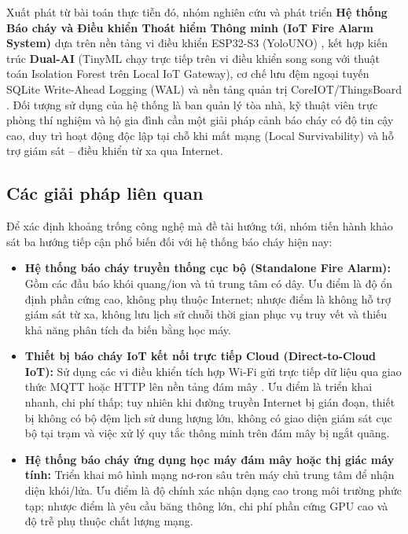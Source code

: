 Xuất phát từ bài toán thực tiễn đó, nhóm nghiên cứu và phát triển \textbf{Hệ thống Báo cháy và Điều khiển Thoát hiểm Thông minh (IoT Fire Alarm System)} dựa trên nền tảng vi điều khiển ESP32-S3 (YoloUNO) \cite{ref_esp32s3}, kết hợp kiến trúc \textbf{Dual-AI} (TinyML chạy trực tiếp trên vi điều khiển song song với thuật toán Isolation Forest \cite{ref_iforest} trên Local IoT Gateway), cơ chế lưu đệm ngoại tuyến SQLite Write-Ahead Logging (WAL) \cite{ref_sqlite_wal} và nền tảng quản trị CoreIOT/ThingsBoard \cite{ref_thingsboard}. Đối tượng sử dụng của hệ thống là ban quản lý tòa nhà, kỹ thuật viên trực phòng thí nghiệm và hộ gia đình cần một giải pháp cảnh báo cháy có độ tin cậy cao, duy trì hoạt động độc lập tại chỗ khi mất mạng (Local Survivability) và hỗ trợ giám sát -- điều khiển từ xa qua Internet.

\subsection{Các giải pháp liên quan}
\label{subsec:giai-phap-lien-quan}

Để xác định khoảng trống công nghệ mà đề tài hướng tới, nhóm tiến hành khảo sát ba hướng tiếp cận phổ biến đối với hệ thống báo cháy hiện nay:

\begin{itemize}[leftmargin=*, itemsep=3pt]
  \item \textbf{Hệ thống báo cháy truyền thống cục bộ (Standalone Fire Alarm):} Gồm các đầu báo khói quang/ion và tủ trung tâm có dây. Ưu điểm là độ ổn định phần cứng cao, không phụ thuộc Internet; nhược điểm là không hỗ trợ giám sát từ xa, không lưu lịch sử chuỗi thời gian phục vụ truy vết và thiếu khả năng phân tích đa biến bằng học máy.
  \item \textbf{Thiết bị báo cháy IoT kết nối trực tiếp Cloud (Direct-to-Cloud IoT):} Sử dụng các vi điều khiển tích hợp Wi-Fi gửi trực tiếp dữ liệu qua giao thức MQTT \cite{ref_mqtt} hoặc HTTP lên nền tảng đám mây \cite{ref_fire_survey}. Ưu điểm là triển khai nhanh, chi phí thấp; tuy nhiên khi đường truyền Internet bị gián đoạn, thiết bị không có bộ đệm lịch sử dung lượng lớn, không có giao diện giám sát cục bộ tại trạm và việc xử lý quy tắc thông minh trên đám mây bị ngắt quãng.
  \item \textbf{Hệ thống báo cháy ứng dụng học máy đám mây hoặc thị giác máy tính:} Triển khai mô hình mạng nơ-ron sâu trên máy chủ trung tâm để nhận diện khói/lửa. Ưu điểm là độ chính xác nhận dạng cao trong môi trường phức tạp; nhược điểm là yêu cầu băng thông lớn, chi phí phần cứng GPU cao và độ trễ phụ thuộc chất lượng mạng.
\end{itemize}

